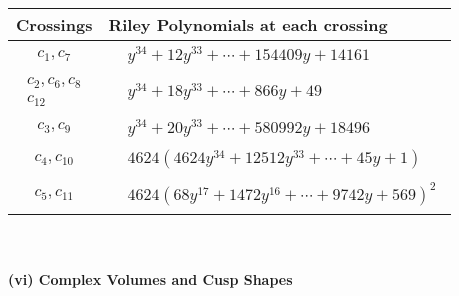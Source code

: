 \documentclass[1p]{elsarticle_modified}
\theoremstyle{definition}
\begin{document}
\begin{tabular}{m{50pt}|m{274pt}}
Crossings & \hspace{64pt}Riley Polynomials at each crossing \\
\hline $$\begin{aligned}c_{1},c_{7}\end{aligned}$$&$\begin{aligned}
&y^{34}+12 y^{33}+\cdots+154409 y+14161
\end{aligned}$\\
\hline $$\begin{aligned}c_{2},c_{6},c_{8}\\c_{12}\end{aligned}$$&$\begin{aligned}
&y^{34}+18 y^{33}+\cdots+866 y+49
\end{aligned}$\\
\hline $$\begin{aligned}c_{3},c_{9}\end{aligned}$$&$\begin{aligned}
&y^{34}+20 y^{33}+\cdots+580992 y+18496
\end{aligned}$\\
\hline $$\begin{aligned}c_{4},c_{10}\end{aligned}$$&$\begin{aligned}
&4624(4624 y^{34}+12512 y^{33}+\cdots+45 y+1)
\end{aligned}$\\
\hline $$\begin{aligned}c_{5},c_{11}\end{aligned}$$&$\begin{aligned}
&4624(68 y^{17}+1472 y^{16}+\cdots+9742 y+569)^{2}
\end{aligned}$\\
\hline
\end{tabular}\\~\\
\newpage\flushleft \textbf{(vi) Complex Volumes and Cusp Shapes}
\end{document}
